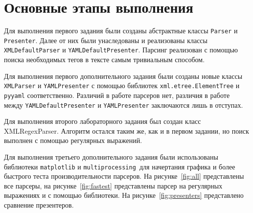 \section{Основные этапы выполнения}
Для выполнения первого задания были созданы абстрактные классы \texttt{Parser} и \texttt{Presenter}.
Далее от них были унаследованы и реализованы классы \texttt{XMLDefaultParser} и \texttt{YAMLDefaultPresenter}.
Парсинг реализован с помощью поиска необходимых тегов в тексте самым тривиальным способом.

Для выполнения первого дополнительного задания были созданы новые классы \texttt{XMLParser} и \texttt{YAMLPresenter} с помощью
библиотек \texttt{xml.etree.ElementTree} и \texttt{pyyaml} соответственно.
Различий в работе парсеров нет, различия в работе между \texttt{YAMLDefaultPresenter} и \texttt{YAMLPresenter} заключаются лишь
в отступах.

Для выполнения второго лабораторного задания был создан класс XMLRegexParser.
Алгоритм остался таким же, как и в первом задании, но поиск выполнен с помощью регулярных выражений.

Для выполнения третьего дополнительного задания были использованы библиотеки \texttt{matplotlib} и \texttt{multiprocessing
}для начертания графика и более быстрого теста производительности парсеров. На рисунке~\ref{fig:all} представлены все парсеры,
на рисунке~\ref{fig:fastest} представлены парсер на регулярных выражениях и с помощью библиотеки.
На рисунке~\ref{fig:presenters} представлено сравнение презентеров.

